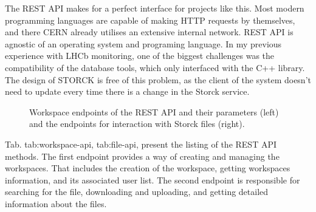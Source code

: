 The REST API makes for a perfect interface for projects like this.
Most modern programming languages are capable of making HTTP requests by themselves, and there CERN already utilises an extensive internal network.
REST API is agnostic of an operating system and programing language.
In my previous experience with LHCb monitoring, one of the biggest challenges was the compatibility of the database tools, which only interfaced with the C++ library.
The design of STORCK is free of this problem, as the client of the system doesn't need to update every time there is a change in the Storck service.


\begin{figure}
\quad
{}

\label{tab:storck_rest_api}
    \caption{ Workspace endpoints of the REST API and their parameters (left) and the endpoints for interaction with Storck files (right). }
\end{figure}

Tab. {tab:workspace-api}, {tab:file-api}, present the listing of the REST API methods.
The first endpoint provides a way of creating and managing the workspaces. That includes the creation of the workspace, getting workspaces information, and its associated user list.
The second endpoint is responsible for searching for the file, downloading and uploading, and getting detailed information about the files.

